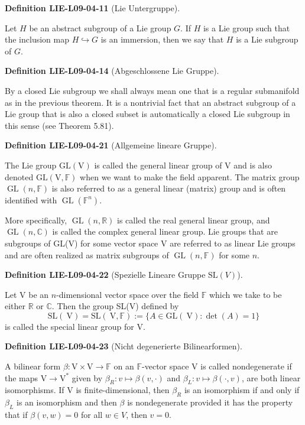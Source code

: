 \documentclass[10pt, letterpaper]{article}
\newcommand{\SL}{\mathrm{SL}}
\newcommand{\CustomHeading}[3]{%
  \par\medskip\noindent%
  \textbf{#1 #2} \textnormal{(#3)}.\enskip%
}
\newenvironment{DEF}[2]{\CustomHeading{Definition}{#1}{#2}}{}
\begin{document}
\begin{DEF}{LIE-L09-04-11}{Lie Untergruppe}
Let $H$ be an abstract subgroup of a Lie group $G$. If $H$ is a Lie group such that the inclusion map $H \hookrightarrow G$ is an immersion, then we say that $H$ is a Lie subgroup of $G$.
\end{DEF}

\begin{DEF}{LIE-L09-04-14}{Abgeschlossene Lie Gruppe}
By a closed Lie subgroup we shall always mean one that is a regular submanifold as in the previous theorem. It is a nontrivial fact that an abstract subgroup of a Lie group that is also a closed subset is automatically a closed Lie subgroup in this sense (see Theorem 5.81).
\end{DEF}

\begin{DEF}{LIE-L09-04-21}{Allgemeine lineare Gruppe}
The Lie group $\mathrm{GL}(\mathrm{V})$ is called the general linear group of V and is also denoted $\mathrm{GL}(\mathrm{V}, \mathbb{F})$ when we want to make the field apparent. The matrix group $\operatorname{GL}(n, \mathbb{F})$ is also referred to as a general linear (matrix) group and is often identified with $\operatorname{GL}\left(\mathbb{F}^{n}\right)$.


More specifically, $\operatorname{GL}(n, \mathbb{R})$ is called the real general linear group, and $\operatorname{GL}(n, \mathbb{C})$ is called the complex general linear group. Lie groups that are subgroups of GL(V) for some vector space V are referred to as linear Lie groups and are often realized as matrix subgroups of $\operatorname{GL}(n, \mathbb{F})$ for some $n$.
\end{DEF}

\begin{DEF}{LIE-L09-04-22}{Spezielle Lineare Gruppe $\SL(V)$}
Let V be an $n$-dimensional vector space over the field $\mathbb{F}$ which we take to be either $\mathbb{R}$ or $\mathbb{C}$. Then the group SL(V) defined by
$$
\mathrm{SL}(\mathrm{~V})=\mathrm{SL}(\mathrm{~V}, \mathbb{F}):=\{A \in \mathrm{GL}(\mathrm{~V}): \operatorname{det}(A)=1\}
$$
is called the special linear group for V.
\end{DEF}

\begin{DEF}{LIE-L09-04-23}{Nicht degenerierte Bilinearformen}
A bilinear form $\beta: \mathrm{V} \times \mathrm{V} \rightarrow \mathbb{F}$ on an $\mathbb{F}$-vector space V is called nondegenerate if the maps $\mathrm{V} \rightarrow \mathrm{V}^{*}$ given by $\beta_{R}: v \mapsto \beta(v, \cdot)$ and $\beta_{L}: v \mapsto \beta(\cdot, v)$, are both linear isomorphisms. If V is finite-dimensional, then $\beta_{R}$ is an isomorphism if and only if $\beta_{L}$ is an isomorphism and then $\beta$ is nondegenerate provided it has the property that if $\beta(v, w)=0$ for all $w \in V$, then $v=0$.
\end{DEF}
\end{document}
